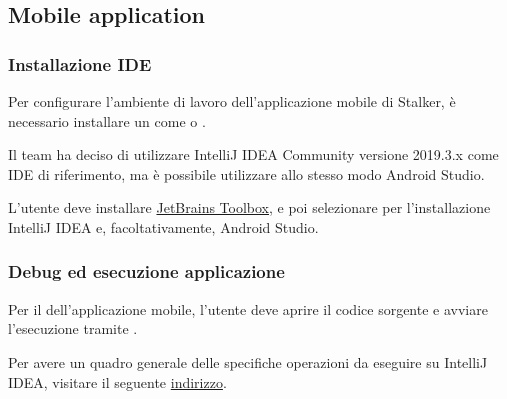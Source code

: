 \documentclass[../manuale-sviluppatore.tex]{subfiles}
\begin{document}
\subsection{Mobile application}%
\label{sub:mobile_application}


\subsubsection{Installazione IDE}%
\label{subs:installazione_ide}

Per configurare l'ambiente di lavoro dell'applicazione mobile di Stalker, è necessario installare un  come  o .

Il team ha deciso di utilizzare IntelliJ IDEA Community versione 2019.3.x come IDE di riferimento, ma è possibile utilizzare allo stesso modo Android Studio.

L'utente deve installare \href{https://www.jetbrains.com/toolbox-app/}{JetBrains Toolbox}, e poi selezionare per l'installazione IntelliJ IDEA e, facoltativamente, Android Studio.

\subsubsection{Debug ed esecuzione applicazione}%
\label{subs:debug_ed_esecuzione_applicazione}

Per il  dell'applicazione mobile, l'utente deve aprire il codice sorgente e avviare l'esecuzione tramite .


Per avere un quadro generale delle specifiche operazioni da eseguire su IntelliJ IDEA, visitare il seguente \href{https://www.jetbrains.com/help/idea/running-and-debugging-android-applications.html}{indirizzo}.
\end{document}
